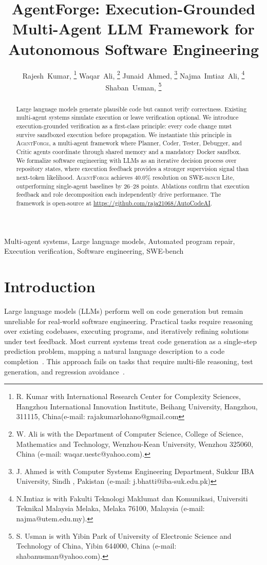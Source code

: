 \documentclass[journal]{IEEEtran}
\title{AgentForge: Execution-Grounded Multi-Agent LLM Framework for Autonomous Software Engineering}
\author{
    Rajesh~Kumar, %
    \thanks{R. Kumar with International Research Center for Complexity Sciences, Hangzhou International Innovation Institute, Beihang University, Hangzhou, 311115, China(e-mail: rajakumarlohano@gmail.com}%
    Waqar~Ali, %
    \thanks{W. Ali is with the Department of Computer Science, College of Science, Mathematics and Technology, Wenzhou-Kean University, Wenzhou 325060, China (e-mail: waqar.uestc@yahoo.com).}%
    Junaid~Ahmed, %
     \thanks{ J. Ahmed is with Computer Systems Engineering Department, Sukkur IBA University, Sindh , Pakistan (e-mail: j.bhatti@iba-suk.edu.pk) }%
    Najma~Imtiaz~Ali, %
     \thanks{N.Imtiaz is with Fakulti Teknologi Maklumat dan Komunikasi, Universiti Teknikal Malaysia Melaka, Melaka 76100, Malaysia (e-mail:  najma@utem.edu.my).}%
    Shaban~Usman, %
     \thanks{S. Usman is with Yibin Park of University of Electronic Science and Technology of China, Yibin 644000, China (e-mail:  shabanusman@yahoo.com).}%

}
\newcommand{\agentforge}{\textsc{AgentForge}}
\newcommand{\swebench}{\textsc{SWE-bench}}
\begin{document}
\maketitle

\begin{abstract}
Large language models generate plausible code but cannot verify correctness. Existing multi-agent systems simulate execution or leave verification optional. We introduce execution-grounded verification as a first-class principle: every code change must survive sandboxed execution before propagation. We instantiate this principle in \agentforge{}, a multi-agent framework where Planner, Coder, Tester, Debugger, and Critic agents coordinate through shared memory and a mandatory Docker sandbox. We formalize software engineering with LLMs as an iterative decision process over repository states, where execution feedback provides a stronger supervision signal than next-token likelihood. \agentforge{} achieves 40.0\% resolution on \swebench{} Lite, outperforming single-agent baselines by 26--28 points. Ablations confirm that execution feedback and role decomposition each independently drive performance. The framework is open-source at \url{https://github.com/raja21068/AutoCodeAI}.
\end{abstract}

\begin{IEEEkeywords}
Multi-agent systems, Large language models, Automated program repair, Execution verification, Software engineering, SWE-bench
\end{IEEEkeywords}

\section{Introduction}
\label{sec:intro}

Large language models (LLMs) perform well on code generation but remain unreliable for real-world software engineering. Practical tasks require reasoning over existing codebases, executing programs, and iteratively refining solutions under test feedback. Most current systems treat code generation as a single-step prediction problem, mapping a natural language description to a code completion~\cite{brown2020language}. This approach fails on tasks that require multi-file reasoning, test generation, and regression avoidance~\cite{chen2021codex}.
\end{document}
